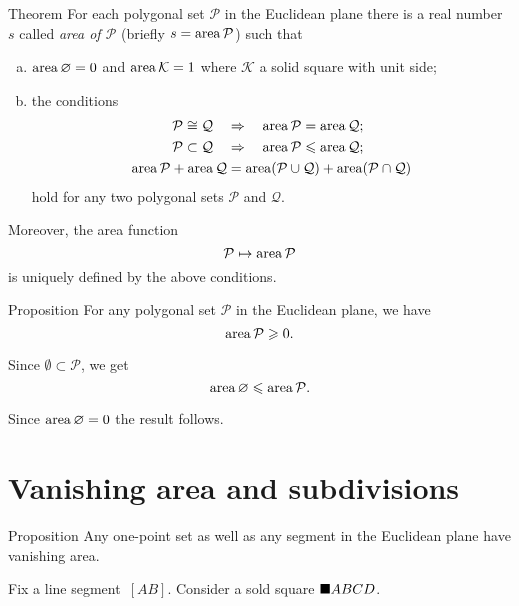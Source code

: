 \begin{thm}{Theorem}\label{thm:area}
For each polygonal set $\mathcal{P}$ in the Euclidean plane 
there is a real number $s$ 
called \emph{area of $\mathcal{P}$} 
(briefly $s=\mathop{\rm area}\nolimits \mathcal{P}$) such that 
\begin{enumerate}[(a)]
\item $\mathop{\rm area}\nolimits\varnothing=0$ and
$\mathop{\rm area}\nolimits\mathcal{K}=1$
where  $\mathcal{K}$ a solid square with unit side;

\item the conditions
\begin{align*}
\mathcal{P}\cong\mathcal{Q}
\quad 
&\Rightarrow
\quad \mathop{\rm area}\nolimits\mathcal{P}=\mathop{\rm area}\nolimits\mathcal{Q};
\\
\mathcal{P}\subset\mathcal{Q}
\quad
&\Rightarrow
\quad 
\mathop{\rm area}\nolimits\mathcal{P}\leqslant\mathop{\rm area}\nolimits\mathcal{Q};
\\
\mathop{\rm area}\nolimits\mathcal{P}+\mathop{\rm area}\nolimits\mathcal{Q}
&=
\mathop{\rm area}\nolimits(\mathcal{P}\cup\mathcal{Q})+\mathop{\rm area}\nolimits(\mathcal{P}\cap\mathcal{Q})
\end{align*}
hold 
for any two polygonal sets $\mathcal{P}$ and $\mathcal{Q}$.
\end{enumerate}


Moreover, the area function 
\[\mathcal{P}\mapsto \mathop{\rm area}\nolimits \mathcal{P}\]
is uniquely defined by the above conditions.
\end{thm}

\begin{thm}{Proposition}\label{prop:area-positive}
For any polygonal set $\mathcal{P}$ in the Euclidean plane, 
we have
\[\mathop{\rm area}\nolimits\mathcal{P}\geqslant 0.\]

\end{thm}

Since $\emptyset \subset \mathcal{P}$,
we get
\[\mathop{\rm area}\nolimits\varnothing\leqslant \mathop{\rm area}\nolimits\mathcal{P}.\]

Since $\mathop{\rm area}\nolimits\varnothing=0$ the result follows.\qeds



\section*{Vanishing area and subdivisions}

\begin{thm}{Proposition}\label{prop:area-segment}
Any one-point set as well as any segment in the Euclidean plane have  vanishing area.
\end{thm}

Fix a line segment~$[AB]$.
Consider a sold square $\blacksquare ABCD$.


